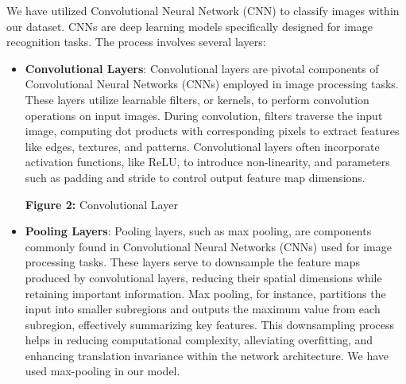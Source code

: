 \documentclass[conference]{IEEEtran}
\begin{document}
\vspace{\baselineskip}

We have utilized Convolutional Neural Network (CNN) to classify images within our dataset. CNNs are deep learning models specifically designed for image recognition tasks. The process involves several layers:

\vspace{\baselineskip}

\begin{itemize}
    \item \textbf{Convolutional Layers}: Convolutional layers are pivotal components of Convolutional Neural Networks (CNNs) employed in image processing tasks. These layers utilize learnable filters, or kernels, to perform convolution operations on input images. During convolution, filters traverse the input image, computing dot products with corresponding pixels to extract features like edges, textures, and patterns. Convolutional layers often incorporate activation functions, like ReLU, to introduce non-linearity, and parameters such as padding and stride to control output feature map dimensions.
    
    \vspace{\baselineskip}

    \begin{center}

      \vspace{\baselineskip}

      \textbf{Figure 2:} Convolutional Layer
    \end{center}

    \vspace{\baselineskip}

    \item \textbf{Pooling Layers}: Pooling layers, such as max pooling, are components commonly found in Convolutional Neural Networks (CNNs) used for image processing tasks. These layers serve to downsample the feature maps produced by convolutional layers, reducing their spatial dimensions while retaining important information. Max pooling, for instance, partitions the input into smaller subregions and outputs the maximum value from each subregion, effectively summarizing key features. This downsampling process helps in reducing computational complexity, alleviating overfitting, and enhancing translation invariance within the network architecture. We have used max-pooling in our model.
    

\end{itemize}
\end{document}
